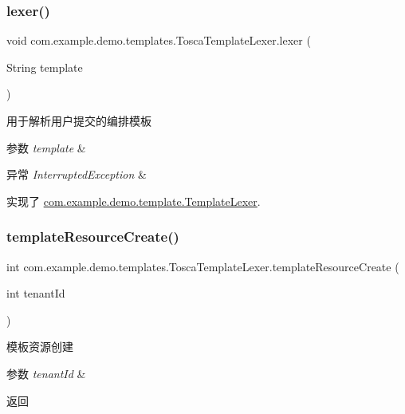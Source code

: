 \subsubsection{\texorpdfstring{lexer()}{lexer()}}
{\footnotesize\ttfamily void com.\+example.\+demo.\+templates.\+Tosca\+Template\+Lexer.\+lexer (\begin{DoxyParamCaption}\item[{String}]{template }\end{DoxyParamCaption})}

用于解析用户提交的编排模板 
\begin{DoxyParams}{参数}
{\em template} & \\
\hline
\end{DoxyParams}

\begin{DoxyExceptions}{异常}
{\em Interrupted\+Exception} & \\
\hline
\end{DoxyExceptions}


实现了 \mbox{\hyperlink{interfacecom_1_1example_1_1demo_1_1template_1_1_template_lexer_af43b628c7563000d156b02cc76c1abce}{com.\+example.\+demo.\+template.\+Template\+Lexer}}.

\mbox{\label{classcom_1_1example_1_1demo_1_1templates_1_1_tosca_template_lexer_a47a9186303228b682b6276712c8fa9cb}} 
\subsubsection{\texorpdfstring{template\+Resource\+Create()}{templateResourceCreate()}}
{\footnotesize\ttfamily int com.\+example.\+demo.\+templates.\+Tosca\+Template\+Lexer.\+template\+Resource\+Create (\begin{DoxyParamCaption}\item[{int}]{tenant\+Id }\end{DoxyParamCaption})}

模板资源创建 
\begin{DoxyParams}{参数}
{\em tenant\+Id} & \\
\hline
\end{DoxyParams}
\begin{DoxyReturn}{返回}

\end{DoxyReturn}

